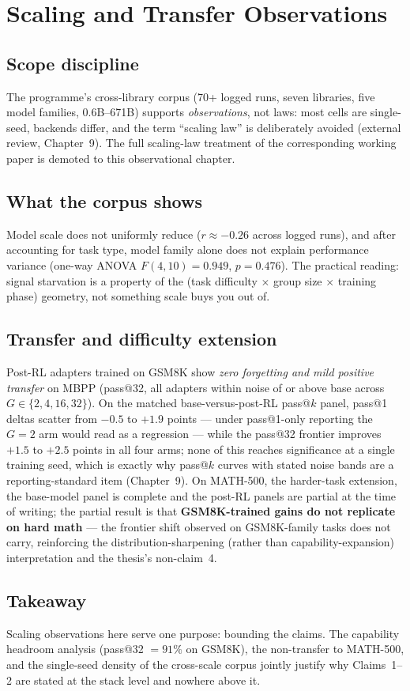 \chapter{Scaling and Transfer Observations}
\label{ch:scaling}

\section{Scope discipline}
The programme's cross-library corpus (70+ logged runs, seven libraries, five
model families, 0.6B--671B) supports \emph{observations}, not laws: most cells
are single-seed, backends differ, and the term ``scaling law'' is deliberately
avoided (external review, Chapter~9). The full scaling-law treatment of the
corresponding working paper is demoted to this observational chapter.

\section{What the corpus shows}
Model scale does not uniformly reduce \ZVF{} ($r\approx-0.26$ across logged
runs), and after accounting for task type, model family alone does not explain
performance variance (one-way ANOVA $F(4,10){=}0.949$, $p{=}0.476$). The
practical reading: signal starvation is a property of the (task difficulty
$\times$ group size $\times$ training phase) geometry, not something scale
buys you out of.

\section{Transfer and difficulty extension}
Post-RL adapters trained on GSM8K show \emph{zero forgetting and mild positive
transfer} on MBPP (pass@32, all adapters within noise of or above base across
$G\in\{2,4,16,32\}$). On the matched base-versus-post-RL pass@$k$ panel,
pass@1 deltas scatter from $-0.5$ to $+1.9$ points --- under pass@1-only
reporting the $G{=}2$ arm would read as a regression --- while the pass@32
frontier improves $+1.5$ to $+2.5$ points in all four arms; none of this
reaches significance at a single training seed, which is exactly why pass@$k$
curves with stated noise bands are a reporting-standard item (Chapter~9).
On MATH-500, the harder-task extension, the base-model panel is complete and
the post-RL panels are partial at the time of writing; the partial result is
that \textbf{GSM8K-trained gains do not replicate on hard math} --- the
frontier shift observed on GSM8K-family tasks does not carry, reinforcing the
distribution-sharpening (rather than capability-expansion) interpretation and
the thesis's non-claim~4.

\section{Takeaway}
Scaling observations here serve one purpose: bounding the claims. The
capability headroom analysis (pass@32 $=91\%$ on GSM8K), the non-transfer to
MATH-500, and the single-seed density of the cross-scale corpus jointly
justify why Claims~1--2 are stated at the stack level and nowhere above it.
